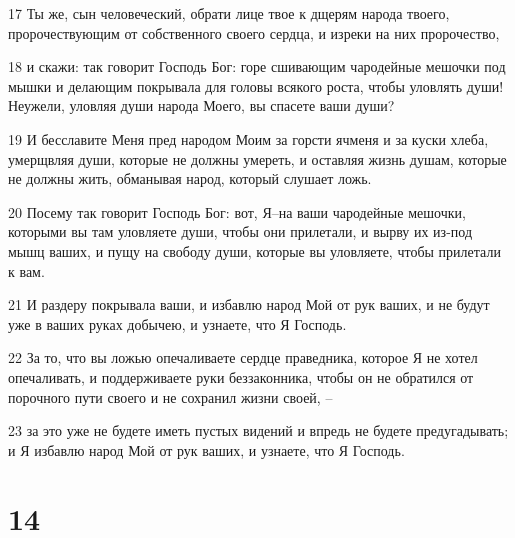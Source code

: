 \par 17 Ты же, сын человеческий, обрати лице твое к дщерям народа твоего, пророчествующим от собственного своего сердца, и изреки на них пророчество,
\par 18 и скажи: так говорит Господь Бог: горе сшивающим чародейные мешочки под мышки и делающим покрывала для головы всякого роста, чтобы уловлять души! Неужели, уловляя души народа Моего, вы спасете ваши души?
\par 19 И бесславите Меня пред народом Моим за горсти ячменя и за куски хлеба, умерщвляя души, которые не должны умереть, и оставляя жизнь душам, которые не должны жить, обманывая народ, который слушает ложь.
\par 20 Посему так говорит Господь Бог: вот, Я--на ваши чародейные мешочки, которыми вы там уловляете души, чтобы они прилетали, и вырву их из-под мышц ваших, и пущу на свободу души, которые вы уловляете, чтобы прилетали к вам.
\par 21 И раздеру покрывала ваши, и избавлю народ Мой от рук ваших, и не будут уже в ваших руках добычею, и узнаете, что Я Господь.
\par 22 За то, что вы ложью опечаливаете сердце праведника, которое Я не хотел опечаливать, и поддерживаете руки беззаконника, чтобы он не обратился от порочного пути своего и не сохранил жизни своей, --
\par 23 за это уже не будете иметь пустых видений и впредь не будете предугадывать; и Я избавлю народ Мой от рук ваших, и узнаете, что Я Господь.

\chapter{14}

